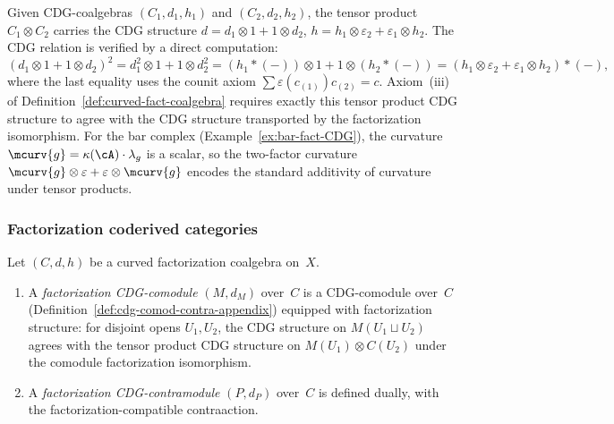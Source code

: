 \begin{remark}
\label{rem:curvature-factorization}
Given CDG-coalgebras $(C_1, d_1, h_1)$ and $(C_2, d_2, h_2)$,
the tensor product $C_1 \otimes C_2$ carries the CDG structure
$d = d_1 \otimes 1 + 1 \otimes d_2$,
$h = h_1 \otimes \varepsilon_2 + \varepsilon_1 \otimes h_2$.
The CDG relation is verified by a direct computation:
\[
(d_1 \otimes 1 + 1 \otimes d_2)^2
= d_1^2 \otimes 1 + 1 \otimes d_2^2
= (h_1 \ast ({-})) \otimes 1 + 1 \otimes (h_2 \ast ({-}))
= (h_1 \otimes \varepsilon_2 + \varepsilon_1 \otimes h_2)
\ast ({-}),
\]
where the last equality uses the counit axiom
$\sum \varepsilon(c_{(1)}) c_{(2)} = c$.
Axiom~(iii) of Definition~\ref{def:curved-fact-coalgebra}
requires exactly this tensor product CDG structure to agree with
the CDG structure transported by the factorization isomorphism.
For the bar complex (Example~\ref{ex:bar-fact-CDG}), the curvature
$\mcurv{g} = \kappa(\cA) \cdot \lambda_g$ is a scalar, so the
two-factor curvature
$\mcurv{g} \otimes \varepsilon + \varepsilon \otimes \mcurv{g}$
encodes the standard additivity of curvature under tensor products.
\end{remark}

\subsubsection*{Factorization coderived categories}

\begin{definition}
\label{def:fact-cdg-comod-contra}
Let $(C, d, h)$ be a curved factorization coalgebra on~$X$.
\begin{enumerate}[label=\textup{(\roman*)}]
\item A \emph{factorization CDG-comodule} $(M, d_M)$ over~$C$
  is a CDG-comodule over~$C$
  (Definition~\ref{def:cdg-comod-contra-appendix}) equipped with
  factorization structure: for disjoint opens $U_1, U_2$, the
  CDG structure on $M(U_1 \sqcup U_2)$ agrees with the tensor
  product CDG structure on
  $M(U_1) \otimes C(U_2)$
  under the comodule factorization isomorphism.
\item A \emph{factorization CDG-contramodule} $(P, d_P)$
  over~$C$ is defined dually, with the factorization-compatible
  contraaction.
\end{enumerate}
\end{definition}

